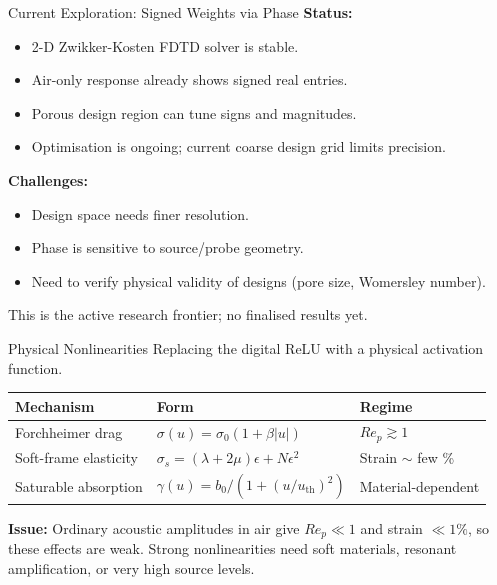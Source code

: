 \documentclass[aspectratio=169,11pt]{beamer}
\begin{document}
\begin{frame}{Current Exploration: Signed Weights via Phase}
  \textbf{Status:}
  \begin{itemize}
    \item 2-D Zwikker-Kosten FDTD solver is stable.
    \item Air-only response already shows signed real entries.
    \item Porous design region can tune signs and magnitudes.
    \item Optimisation is ongoing; current coarse design grid limits precision.
  \end{itemize}

  \vspace{0.3cm}
  \textbf{Challenges:}
  \begin{itemize}
    \item Design space needs finer resolution.
    \item Phase is sensitive to source/probe geometry.
    \item Need to verify physical validity of designs (pore size, Womersley number).
  \end{itemize}

  \vspace{0.3cm}
  \textcolor{gdpSlate}{\small This is the active research frontier; no finalised results yet.}
\end{frame}

\begin{frame}{Physical Nonlinearities}
  Replacing the digital ReLU with a physical activation function.

  \vspace{0.3cm}
  \begin{tabular}{lll}
    \toprule
    \textbf{Mechanism} & \textbf{Form} & \textbf{Regime} \\
    \midrule
    Forchheimer drag & $\sigma(u) = \sigma_0(1 + \beta |u|)$ & $Re_p \gtrsim 1$ \\
    Soft-frame elasticity & $\sigma_s = (\lambda + 2\mu)\epsilon + N\epsilon^2$ & Strain $\sim$ few \% \\
    Saturable absorption & $\gamma(u) = b_0 / (1 + (u/u_\text{th})^2)$ & Material-dependent \\
    \bottomrule
  \end{tabular}

  \vspace{0.3cm}
  \textbf{Issue:} Ordinary acoustic amplitudes in air give $Re_p \ll 1$ and strain $\ll 1\%$, so these effects are weak. Strong nonlinearities need soft materials, resonant amplification, or very high source levels.
\end{frame}
\end{document}
